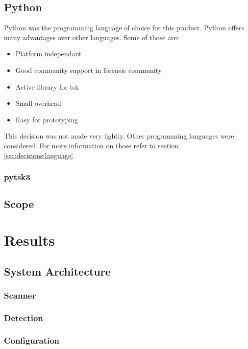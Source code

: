 \documentclass[
	a4paper,					%
	10pt,							%
	twoside,					%
	openright,				%
	notitlepage,			%
	parskip=half,			%
]{scrreprt}					%
\begin{document}
\section{Python}
\label{sec:python}

Python was the programming language of choice for this product. Python offers many advantages over other languages. Some of those are:

\begin{itemize}
	\item Platform independant
	\item Good community support in forensic community
	\item Active library for \gls{tsk}
	\item Small overhead
	\item Easy for prototyping
\end{itemize}

This decision was not made very lightly. Other programming languages were considered. For more information on those refer to section \ref{sec:decisions:language}.

\subsection{pytsk3}
\label{sec:pytsk3}

\section{Scope}
\label{sec:scope}


\chapter{Results}

\section{System Architecture}
\label{sec:Architecture}

\subsection{Scanner}
\label{sec:Scanner}

\subsection{Detection}
\label{sec:Detection}

\subsection{Configuration}
\label{sec:Configuration}
\end{document}
